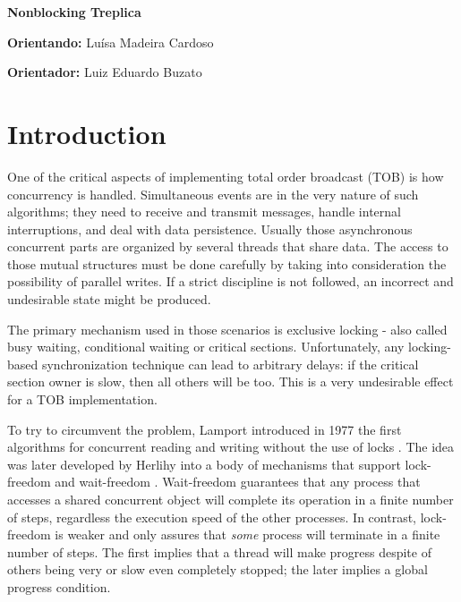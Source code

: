 \documentclass[12pt,twoside,a4paper]{article}
\begin{document}
\vskip 15mm

\begin{center}
\textbf{Nonblocking Treplica}
\end{center}

\vskip 5mm

\textbf{Orientando:} Luísa Madeira Cardoso

\textbf{Orientador:} Luiz Eduardo Buzato

\vskip 20mm

\begin{abstract}

\end{abstract}

\newpage
\pagestyle{plain}
\headheight 0.0cm
\headsep 0.0cm
\footskip 2.2cm

\section{Introduction}
One of the critical aspects of implementing total order broadcast (TOB) is how
concurrency is handled. Simultaneous events are in the very nature of such
algorithms; they need to receive and transmit messages, handle internal
interruptions, and deal with data persistence. Usually those asynchronous
concurrent parts are organized by several threads that share data. The access to
those mutual structures must be done carefully by taking into consideration the
possibility of parallel writes. If a strict discipline is not followed, an
incorrect and undesirable state might be produced.

The primary mechanism used in those scenarios is exclusive locking - also called
busy waiting, conditional waiting or critical sections. Unfortunately, any
locking-based synchronization technique can lead  to arbitrary delays: if the
critical section owner is slow, then all others will be too. This is a very
undesirable effect for a TOB implementation.

To try to circumvent the problem, Lamport introduced in 1977 the first algorithms
for concurrent reading and writing without the use of locks \cite{lamport77b}.
The idea was later developed by Herlihy into a body of mechanisms that support
lock-freedom and wait-freedom \cite{herlihy1990methodology}. Wait-freedom
guarantees that any process that accesses a shared concurrent  object will
complete its operation in a finite number of steps, regardless  the execution
speed of the other processes. In contrast, lock-freedom is weaker and only
assures that \textit{some} process will terminate in a finite number of steps.
The first implies that a thread will make progress despite of others being very
or slow even completely stopped; the later implies a global progress condition.
\end{document}
